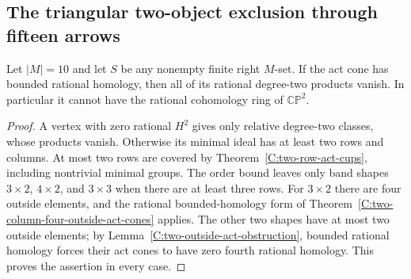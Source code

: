 \subsection{The triangular two-object exclusion through fifteen arrows}

\begin{lemma}
\label{C:ten-rational-act-cones}
Let $|M|=10$ and let $S$ be any nonempty finite right $M$-set.
If the act cone has bounded rational homology, then all of its
rational degree-two products vanish.  In particular it cannot
have the rational cohomology ring of $\mathbb{CP}^2$.
\end{lemma}
\begin{proof}
A vertex with zero rational $H^2$ gives only relative degree-two
classes, whose products vanish.  Otherwise its minimal ideal has
at least two rows and columns.  At most two rows are covered by
Theorem~\ref{C:two-row-act-cups}, including nontrivial minimal
groups.  The order bound leaves only band shapes $3\times2$,
$4\times2$, and $3\times3$ when there are at least three rows.
For $3\times2$ there are four outside elements, and the rational
bounded-homology form of
Theorem~\ref{C:two-column-four-outside-act-cones} applies.
The other two shapes have at most two outside elements; by
Lemma~\ref{C:two-outside-act-obstruction}, bounded rational
homology forces their act cones to have zero fourth rational
homology.  This proves the assertion in every case.
\end{proof}

